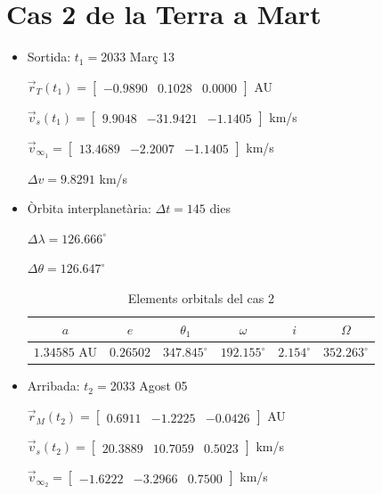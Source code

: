 \section{Cas 2 de la Terra a Mart}
\begin{itemize}
	\item Sortida: $t_{1}=$2033 Març 13

$\vec{r}_{T}(t_{1})=\begin{bmatrix}-0.9890 & 0.1028 & 0.0000\end{bmatrix}$ AU

$\vec{v}_{s}(t_{1})=\begin{bmatrix}9.9048 & -31.9421 & -1.1405\end{bmatrix}$ km/s

$\vec{v}_{\infty_{1}}= \begin{bmatrix}13.4689 & -2.2007 & -1.1405\end{bmatrix}$ km/s

$\Delta v=9.8291$ km/s

	\item Òrbita interplanetària: $\Delta t=145$ dies

$\Delta\lambda=126.666^{\circ}$

$\Delta\theta=126.647^{\circ}$
\begin{table}[h!]
	\centering
	\begin{tabular}{ |c|c|c|c|c|c|}
		\hline
		$a$ & $e$ & $\theta_{1}$ & $\omega$ & $i$ & $\Omega$ \\ \hline
		$1.34585$ AU  & $0.26502$ & $347.845^{\circ}$ & $192.155^{\circ}$ & $2.154^{\circ}$ & $352.263^{\circ}$ \\ \hline
	\end{tabular}
	\caption{Elements orbitals del cas 2}
\end{table}
	\item Arribada: $t_{2}=$2033 Agost 05

$\vec{r}_{M}(t_{2})=\begin{bmatrix}0.6911 & -1.2225 & -0.0426\end{bmatrix}$ AU

$\vec{v}_{s}(t_{2})=\begin{bmatrix}20.3889 & 10.7059 & 0.5023\end{bmatrix}$ km/s


$\vec{v}_{\infty_{2}}=\begin{bmatrix}-1.6222 & -3.2966 & 0.7500\end{bmatrix}$ km/s
\end{itemize}
